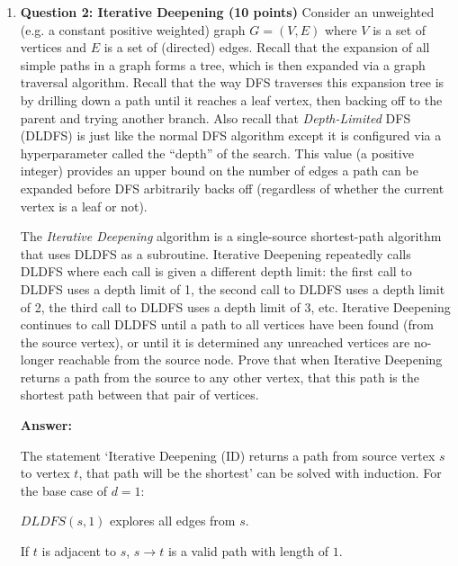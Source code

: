 \documentclass[11pt]{article}
\newenvironment{questions}
  {\begin{enumerate}}
  {\end{enumerate}}
\newcommand{\question}[1]{\item \textbf{#1}}
\newenvironment{answer}
  {\vspace{0.5em}\noindent\textbf{Answer:}\par}
  {\vspace{1em}}
\newenvironment{answercols}
  {\begin{multicols}{2}}
  {\end{multicols}}
\begin{document}
    \begin{questions}
        \question{Question 2: Iterative Deepening (10 points)}
        Consider an unweighted (e.g. a constant positive weighted) graph $G = (V, E)$ where $V$ is a set of vertices and $E$ is a set of (directed) edges. Recall that the expansion of all simple paths in a graph forms a tree, which is then expanded via a graph traversal algorithm. Recall that the way DFS traverses this expansion tree is by drilling down a path until it reaches a leaf vertex, then backing off to the parent and trying another branch. Also recall that \textit{Depth-Limited} DFS (DLDFS) is just like the normal DFS algorithm except it is configured via a hyperparameter called the ``depth'' of the search. This value (a positive integer) provides an upper bound on the number of edges a path can be expanded before DFS arbitrarily backs off (regardless of whether the current vertex is a leaf or not).\newline

        \noindent The \textit{Iterative Deepening} algorithm is a single-source shortest-path algorithm that uses DLDFS as a subroutine. Iterative Deepening repeatedly calls DLDFS where each call is given a different depth limit: the first call to DLDFS uses a depth limit of 1, the second call to DLDFS uses a depth limit of 2, the third call to DLDFS uses a depth limit of 3, etc. Iterative Deepening continues to call DLDFS until a path to all vertices have been found (from the source vertex), or until it is determined any unreached vertices are no-longer reachable from the source node. Prove that when Iterative Deepening returns a path from the source to any other vertex, that this path is the shortest path between that pair of vertices.\newline
    
        \begin{answer}
            The statement `Iterative Deepening (ID) returns a path from source vertex $s$ to vertex $t$, that path will be the shortest' can be solved with induction.
            \newline\newline
            For the base case of $d = 1$:

            \begin{answercols}
                $DLDFS(s, 1)$ explores all edges from $s$.

                If $t$ is adjacent to $s$, $s \to t$ is a valid path with length of $1$.

                \columnbreak


\end{answercols}
\end{answer}
\end{questions}
\end{document}
